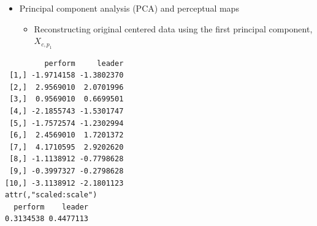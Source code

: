 \documentclass[
  ignorenonframetext,
]{beamer}
\newenvironment{Shaded}{\begin{snugshade}}{\end{snugshade}}
\newcommand{\AttributeTok}[1]{\textcolor[rgb]{0.40,0.45,0.13}{#1}}
\newcommand{\ConstantTok}[1]{\textcolor[rgb]{0.56,0.35,0.01}{#1}}
\newcommand{\DecValTok}[1]{\textcolor[rgb]{0.68,0.00,0.00}{#1}}
\newcommand{\FunctionTok}[1]{\textcolor[rgb]{0.28,0.35,0.67}{#1}}
\newcommand{\NormalTok}[1]{\textcolor[rgb]{0.00,0.23,0.31}{#1}}
\newcommand{\SpecialCharTok}[1]{\textcolor[rgb]{0.37,0.37,0.37}{#1}}
\providecommand{\tightlist}{%
  \setlength{\itemsep}{0pt}\setlength{\parskip}{0pt}}\usepackage{longtable,booktabs,array}
\begin{document}
\begin{frame}[fragile]{}
\label{section-37}
\begin{itemize}
\item
  Principal component analysis (PCA) and perceptual maps

  \begin{itemize}
  \tightlist
  \item
    Reconstructing original centered data using the first principal
    component, \(X_{c, p_1}\)
  \end{itemize}
\end{itemize}

\tiny

\begin{Shaded}
\end{Shaded}

\begin{verbatim}
         perform     leader
 [1,] -1.9714158 -1.3802370
 [2,]  2.9569010  2.0701996
 [3,]  0.9569010  0.6699501
 [4,] -2.1855743 -1.5301747
 [5,] -1.7572574 -1.2302994
 [6,]  2.4569010  1.7201372
 [7,]  4.1710595  2.9202620
 [8,] -1.1138912 -0.7798628
 [9,] -0.3997327 -0.2798628
[10,] -3.1138912 -2.1801123
attr(,"scaled:scale")
  perform    leader 
0.3134538 0.4477113 
\end{verbatim}
\end{frame}
\end{document}
